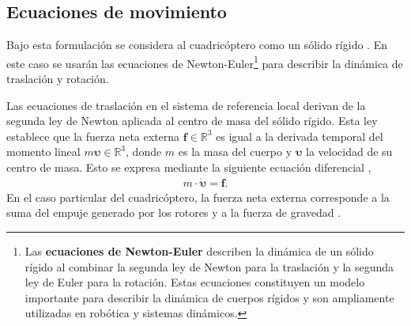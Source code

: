 \subsection{Ecuaciones de movimiento}

Bajo esta formulación se considera al cuadricóptero como un sólido rígido \cite{luukkonen_2011}. En este caso se usarán las ecuaciones de Newton-Euler\footnote{Las \textbf{ecuaciones de Newton-Euler} describen la dinámica de un sólido rígido al combinar la segunda ley de Newton para la traslación y la segunda ley de Euler para la rotación. Estas ecuaciones constituyen un modelo importante para describir la dinámica de cuerpos rígidos y son ampliamente utilizadas en robótica y sistemas dinámicos.\cite{Lynch2017}} para describir la dinámica de traslación y rotación.

Las ecuaciones de traslación en el sistema de referencia local derivan de la segunda ley de Newton aplicada al centro de masa del sólido rígido. Esta ley establece que la fuerza neta externa $\mathbf{f}\in\mathbb{R}^3$ es igual a la derivada temporal del momento lineal $m\bm{\upsilon}\in\mathbb{R}^3$, donde $m$ es la masa del cuerpo y $\bm{\upsilon}$ la velocidad de su centro de masa. Esto se expresa mediante la siguiente ecuación diferencial \cite{Newton-Euler2015},
\begin{align}
\label{eq:newton_second_law}
m \cdot \dot{\bm{\upsilon}} = \mathbf{f}.
\end{align}
En el caso particular del cuadricóptero, la fuerza neta externa corresponde a la suma del empuje generado por los rotores y a la fuerza de gravedad \cite{luukkonen_2011}. 

